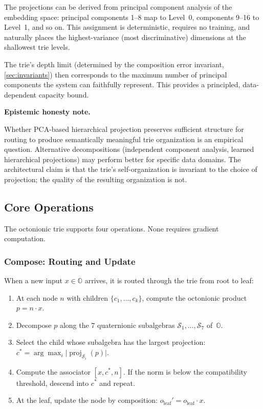 \documentclass[11pt,a4paper]{article}
\theoremstyle{definition}
\theoremstyle{remark}
\DeclareMathOperator{\proj}{proj}
\newcommand{\Oct}{\mathbb{O}}
\newenvironment{epistemicnote}{%
  \medskip\noindent\textbf{Epistemic honesty note.}\itshape\space
}{%
  \medskip
}
\begin{document}
The projections can be derived from principal component analysis of the embedding space: principal components 1--8 map to Level~0, components 9--16 to Level~1, and so on. This assignment is deterministic, requires no training, and naturally places the highest-variance (most discriminative) dimensions at the shallowest trie levels.

The trie's depth limit (determined by the composition error invariant, \cref{sec:invariants}) then corresponds to the maximum number of principal components the system can faithfully represent. This provides a principled, data-dependent capacity bound.

\begin{epistemicnote}
Whether PCA-based hierarchical projection preserves sufficient structure for routing to produce semantically meaningful trie organization is an empirical question. Alternative decompositions (independent component analysis, learned hierarchical projections) may perform better for specific data domains. The architectural claim is that the trie's self-organization is invariant to the choice of projection; the quality of the resulting organization is not.
\end{epistemicnote}

\subsection{Core Operations}
\label{sec:operations}

The octonionic trie supports four operations. None requires gradient computation.

\subsubsection{Compose: Routing and Update}

When a new input $x \in \Oct$ arrives, it is routed through the trie from root to leaf:

\begin{enumerate}[nosep]
  \item At each node $n$ with children $\{c_1, \ldots, c_k\}$, compute the octonionic product $p = n \cdot x$.
  \item Decompose $p$ along the 7 quaternionic subalgebras $\mathcal{S}_1, \ldots, \mathcal{S}_7$ of~$\Oct$.
  \item Select the child whose subalgebra has the largest projection: $c^* = \arg\max_i \lvert \proj_{\mathcal{S}_i}(p) \rvert$.
  \item Compute the associator $[x, c^*, n]$. If the norm is below the compatibility threshold, descend into $c^*$ and repeat.
  \item At the leaf, update the node by composition: $o_{\text{leaf}}' = o_{\text{leaf}} \cdot x$.
\end{enumerate}
\end{document}
